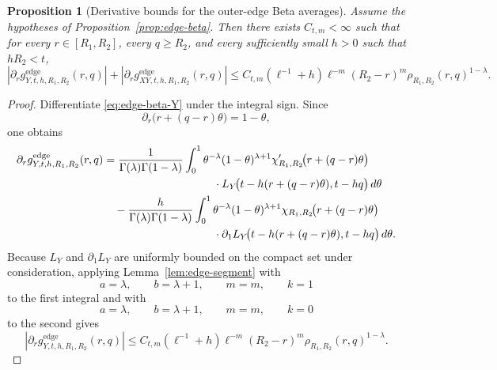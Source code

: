 \documentclass[11pt,a4paper]{amsart}
\theoremstyle{plain}
\newtheorem{proposition}[theorem]{Proposition}
\theoremstyle{definition}
\theoremstyle{remark}
\begin{document}
\begin{proposition}[Derivative bounds for the outer-edge Beta averages]
\label{prop:edge-beta-deriv}
Assume the hypotheses of Proposition~\ref{prop:edge-beta}. Then there exists \(C_{t,m}<\infty\) such
that for every \(r\in[R_1,R_2]\), every \(q\ge R_2\), and every sufficiently small \(h>0\) such
that \(hR_2<t\),
\begin{equation}\label{eq:edge-beta-deriv}
\left|
\partial_r g_{Y,t,h,R_1,R_2}^{\mathrm{edge}}(r,q)
\right|
+
\left|
\partial_r g_{XY,t,h,R_1,R_2}^{\mathrm{edge}}(r,q)
\right|
\le
C_{t,m}(\ell^{-1}+h)\ell^{-m}(R_2-r)^m\rho_{R_1,R_2}(r,q)^{1-\lambda}.
\end{equation}
\end{proposition}

\begin{proof}
Differentiate \eqref{eq:edge-beta-Y} under the integral sign. Since
\[
\partial_r\bigl(r+(q-r)\theta\bigr)=1-\theta,
\]
one obtains
\begin{align*}
\partial_r g_{Y,t,h,R_1,R_2}^{\mathrm{edge}}(r,q)
&=
\frac{1}{\Gamma(\lambda)\Gamma(1-\lambda)}
\int_0^1
\theta^{-\lambda}(1-\theta)^{\lambda+1}
\chi_{R_1,R_2}'\!\bigl(r+(q-r)\theta\bigr)
\notag\\
&\qquad\qquad\qquad\qquad\qquad\cdot
L_Y\!\bigl(t-h(r+(q-r)\theta),t-hq\bigr)\,d\theta
\notag\\
&\quad-
\frac{h}{\Gamma(\lambda)\Gamma(1-\lambda)}
\int_0^1
\theta^{-\lambda}(1-\theta)^{\lambda+1}
\chi_{R_1,R_2}\!\bigl(r+(q-r)\theta\bigr)
\notag\\
&\qquad\qquad\qquad\qquad\qquad\cdot
\partial_1L_Y\!\bigl(t-h(r+(q-r)\theta),t-hq\bigr)\,d\theta.
\end{align*}
Because \(L_Y\) and \(\partial_1L_Y\) are uniformly bounded on the compact set under consideration, applying
Lemma~\ref{lem:edge-segment} with
\[
a=\lambda,\qquad b=\lambda+1,\qquad m=m,\qquad k=1
\]
to the first integral and with
\[
a=\lambda,\qquad b=\lambda+1,\qquad m=m,\qquad k=0
\]
to the second gives
\[
\left|
\partial_r g_{Y,t,h,R_1,R_2}^{\mathrm{edge}}(r,q)
\right|
\le
C_{t,m}(\ell^{-1}+h)\ell^{-m}(R_2-r)^m\rho_{R_1,R_2}(r,q)^{1-\lambda}.
\]


\end{proof}
\end{document}
